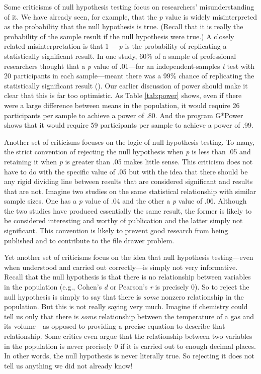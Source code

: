 \documentclass[
]{krantz}
\begin{document}
Some criticisms of null hypothesis testing focus on researchers' misunderstanding of it. We have already seen, for example, that the \emph{p} value is widely misinterpreted as the probability that the null hypothesis is true. (Recall that it is really the probability of the sample result if the null hypothesis were true.) A closely related misinterpretation is that 1 − \emph{p} is the probability of replicating a statistically significant result. In one study, 60\% of a sample of professional researchers thought that a \emph{p} value of .01---for an independent-samples \emph{t} test with 20 participants in each sample---meant there was a 99\% chance of replicating the statistically significant result (). Our earlier discussion of power should make it clear that this is far too optimistic. As Table \ref{tab:power} shows, even if there were a large difference between means in the population, it would require 26 participants per sample to achieve a power of .80. And the program G*Power shows that it would require 59 participants per sample to achieve a power of .99.

Another set of criticisms focuses on the logic of null hypothesis testing. To many, the strict convention of rejecting the null hypothesis when \emph{p} is less than .05 and retaining it when \emph{p} is greater than .05 makes little sense. This criticism does not have to do with the specific value of .05 but with the idea that there should be any rigid dividing line between results that are considered significant and results that are not. Imagine two studies on the same statistical relationship with similar sample sizes. One has a \emph{p} value of .04 and the other a \emph{p} value of .06. Although the two studies have produced essentially the same result, the former is likely to be considered interesting and worthy of publication and the latter simply not significant. This convention is likely to prevent good research from being published and to contribute to the file drawer problem.

Yet another set of criticisms focus on the idea that null hypothesis testing---even when understood and carried out correctly---is simply not very informative. Recall that the null hypothesis is that there is no relationship between variables in the population (e.g., Cohen's \emph{d} or Pearson's \emph{r} is precisely 0). So to reject the null hypothesis is simply to say that there is \emph{some} nonzero relationship in the population. But this is not really saying very much. Imagine if chemistry could tell us only that there is \emph{some} relationship between the temperature of a gas and its volume---as opposed to providing a precise equation to describe that relationship. Some critics even argue that the relationship between two variables in the population is never precisely 0 if it is carried out to enough decimal places. In other words, the null hypothesis is never literally true. So rejecting it does not tell us anything we did not already know!
\end{document}
